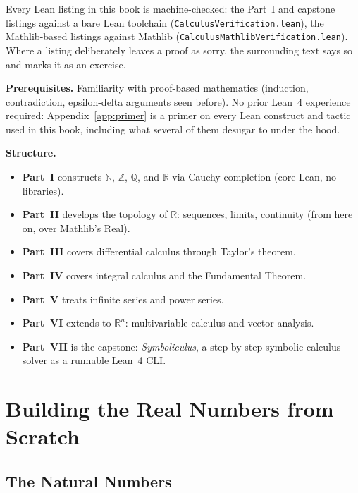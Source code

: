 \documentclass[12pt, openany]{book}
\theoremstyle{plain}
\theoremstyle{definition}
\theoremstyle{remark}
\newcommand{\N}{\mathbb{N}}
\newcommand{\Z}{\mathbb{Z}}
\newcommand{\Q}{\mathbb{Q}}
\newcommand{\R}{\mathbb{R}}
\newcommand{\li}[1]{{\ttfamily\small\color{tealaccent}#1}}
\begin{document}
Every Lean listing in this book is machine-checked: the Part~I and capstone listings against a bare Lean toolchain (\texttt{CalculusVerification.lean}), the Mathlib-based listings against Mathlib (\texttt{CalculusMathlibVerification.lean}). Where a listing deliberately leaves a proof as \li{sorry}, the surrounding text says so and marks it as an exercise.

\medskip\noindent\textbf{Prerequisites.} Familiarity with proof-based mathematics (induction, contradiction, epsilon-delta arguments seen before). No prior Lean~4 experience required: Appendix~\ref{app:primer} is a primer on every Lean construct and tactic used in this book, including what several of them desugar to under the hood.

\medskip\noindent\textbf{Structure.}
\begin{itemize}[noitemsep]
  \item \textbf{Part~I} constructs $\N$, $\Z$, $\Q$, and $\R$ via Cauchy completion (core Lean, no libraries).
  \item \textbf{Part~II} develops the topology of $\R$: sequences, limits, continuity (from here on, over Mathlib's \li{Real}).
  \item \textbf{Part~III} covers differential calculus through Taylor's theorem.
  \item \textbf{Part~IV} covers integral calculus and the Fundamental Theorem.
  \item \textbf{Part~V} treats infinite series and power series.
  \item \textbf{Part~VI} extends to $\R^n$: multivariable calculus and vector analysis.
  \item \textbf{Part~VII} is the capstone: \textit{Symboliculus}, a step-by-step symbolic calculus solver as a runnable Lean~4 CLI.
\end{itemize}

\tableofcontents

\mainmatter\color{black}

\part{Building the Real Numbers from Scratch}
\color{black}

\chapter{The Natural Numbers}
\color{black}
\end{document}
